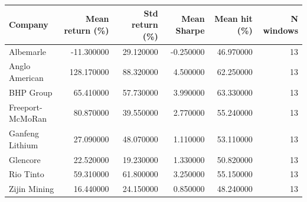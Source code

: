 \begin{tabular}{lrrrrr}
\toprule
Company & Mean return (\%) & Std return (\%) & Mean Sharpe & Mean hit (\%) & N windows \\
\midrule
Albemarle & -11.300000 & 29.120000 & -0.250000 & 46.970000 & 13 \\
Anglo American & 128.170000 & 88.320000 & 4.500000 & 62.250000 & 13 \\
BHP Group & 65.410000 & 57.730000 & 3.990000 & 63.330000 & 13 \\
Freeport-McMoRan & 80.870000 & 39.550000 & 2.770000 & 55.240000 & 13 \\
Ganfeng Lithium & 27.090000 & 48.070000 & 1.110000 & 53.110000 & 13 \\
Glencore & 22.520000 & 19.230000 & 1.330000 & 50.820000 & 13 \\
Rio Tinto & 59.310000 & 61.800000 & 3.250000 & 55.150000 & 13 \\
Zijin Mining & 16.440000 & 24.150000 & 0.850000 & 48.240000 & 13 \\
\bottomrule
\end{tabular}
